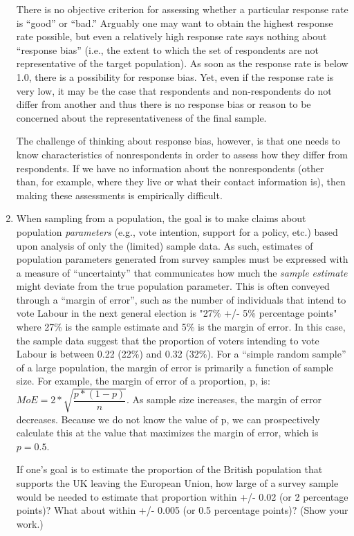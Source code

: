 \documentclass[a4paper]{exam}
\begin{document}
\begin{enumerate}
\begin{solution}
There is no objective criterion for assessing whether a particular response rate is ``good'' or ``bad.'' Arguably one may want to obtain the highest response rate possible, but even a relatively high response rate says nothing about ``response bias'' (i.e., the extent to which the set of respondents are not representative of the target population). As soon as the response rate is below 1.0, there is a possibility for response bias. Yet, even if the response rate is very low, it may be the case that respondents and non-respondents do not differ from another and thus there is no response bias or reason to be concerned about the representativeness of the final sample.

The challenge of thinking about response bias, however, is that one needs to know characteristics of nonrespondents in order to assess how they differ from respondents. If we have no information about the nonrespondents (other than, for example, where they live or what their contact information is), then making these assessments is empirically difficult.
\end{solution}

\item When sampling from a population, the goal is to make claims about population \textit{parameters} (e.g., vote intention, support for a policy, etc.) based upon analysis of only the (limited) sample data. As such, estimates of population parameters generated from survey samples must be expressed with a measure of ``uncertainty'' that communicates how much the \textit{sample estimate} might deviate from the true population parameter. This is often conveyed through a ``margin of error'', such as the number of individuals that intend to vote Labour in the next general election is "27\% +/- 5\% percentage points" where 27\% is the sample estimate and 5\% is the margin of error. In this case, the sample data suggest that the proportion of voters intending to vote Labour is between 0.22 (22\%) and 0.32 (32\%). For a ``simple random sample'' of a large population, the margin of error is primarily a function of sample size. For example, the margin of error of a proportion, p, is: $MoE = 2*\sqrt{\dfrac{p * (1-p)}{n}}$. As sample size increases, the margin of error decreases. Because we do not know the value of p, we can prospectively calculate this at the value that maximizes the margin of error, which is $p=0.5$.
 
If one's goal is to estimate the proportion of the British population that supports the UK leaving the European Union, how large of a survey sample would be needed to estimate that proportion within +/- 0.02 (or 2 percentage points)? What about within +/- 0.005 (or 0.5 percentage points)? (Show your work.)


\end{enumerate}
\end{document}
